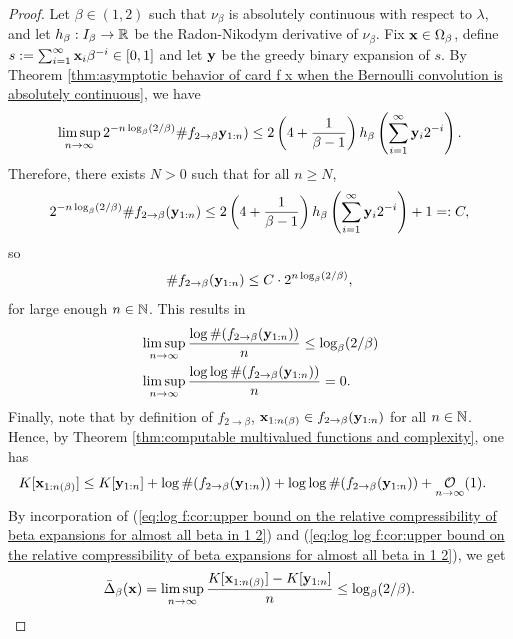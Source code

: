 \begin{proof}
    Let $\beta \in (1,2)$ such that $\nu_\beta$ is absolutely continuous with respect to $\lambda$, and let $h_\beta : I_\beta \to \mathbb{R}$ be the Radon-Nikodym derivative of $\nu_\beta$. Fix ${\bf x} \in \Omega_\beta$, define $s := \sum_{i=1}^\infty {\bf x}_i\beta^{-i} \in [0,1]$ and let ${\bf y}$ be the greedy binary expansion of $s$. By Theorem \ref{thm:asymptotic behavior of card f x when the Bernoulli convolution is absolutely continuous}, we have
    \begin{equation}
        \limsup_{n\to\infty} 2^{-n\log_\beta(2/\beta)} \#f_{2 \to \beta}{\bf y}_{1:n}) \leq 2\left(4 + \frac{1}{\beta-1}\right) h_\beta\left(\sum_{i=1}^\infty {\bf y}_i 2^{-i}\right).
    \end{equation}
    Therefore, there exists $N > 0$ such that for all $n \geq N$, 
    \begin{equation}
        2^{-n\log_\beta(2/\beta)} \#f_{2 \to \beta}({\bf y}_{1:n}) \leq 2\left(4 + \frac{1}{\beta-1}\right) h_\beta\left(\sum_{i=1}^\infty {\bf y}_i 2^{-i}\right) + 1 =: C,
    \end{equation}
    so 
    \begin{equation}
        \#f_{2 \to \beta}({\bf y}_{1:n}) \leq C \cdot 2^{n\log_\beta(2/\beta)},
    \end{equation}
    for large enough $n \in \mathbb{N}$. This results in 
    \begin{align}
        &\limsup_{n \to \infty} \frac{\log\#(f_{2 \to \beta}({\bf y}_{1:n}))}{n} \leq \log_\beta(2/\beta)\label{eq:log f:cor:upper bound on the relative compressibility of beta expansions for almost all beta in 1 2}\\
        &\limsup_{n \to \infty} \frac{\log\log\#(f_{2 \to \beta}({\bf y}_{1:n}))}{n} = 0.\label{eq:log log f:cor:upper bound on the relative compressibility of beta expansions for almost all beta in 1 2}
    \end{align}
    Finally, note that by definition of $f_{2 \to \beta}$, ${\bf x}_{1:n(\beta)} \in f_{2 \to \beta}({\bf y}_{1:n})$ for all $n \in \mathbb{N}$. Hence, by Theorem \ref{thm:computable multivalued functions and complexity}, one has
    \begin{align}
        K[\xf_{1:\nlogbeta}] &\leq K[\yf_{1:n}] + \log\#(f_{2 \to \beta}(\yf_{1:n})) + \log\log\#(f_{2 \to \beta}(\yf_{1:n})) + \bigOx[1]{n}.
    \end{align}
    By incorporation of (\ref{eq:log f:cor:upper bound on the relative compressibility of beta expansions for almost all beta in 1 2}) and (\ref{eq:log log f:cor:upper bound on the relative compressibility of beta expansions for almost all beta in 1 2}), we get
    \begin{equation}
        \bar\Delta_\beta({\bf x}) = \limsup_{n\to\infty} \frac{K[{\bf x}_{1:n(\beta)}]-K[{\bf y}_{1:n}]}{n} \leq \log_\beta(2/\beta).
    \end{equation}
\end{proof}






